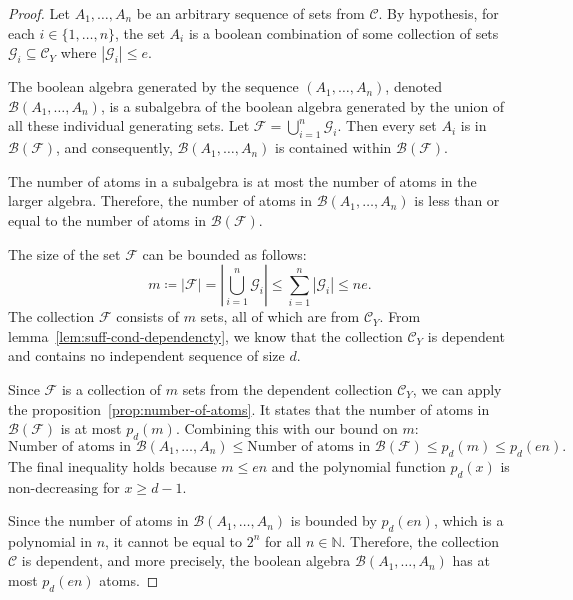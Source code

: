 \begin{proof}

    Let $A_1, \dots, A_n$ be an arbitrary sequence of sets from $\mathcal{C}$. By hypothesis, for each $i \in \{1, \dots, n\}$, the set $A_i$ is a boolean combination of some collection of sets $\mathcal{G}_i \subseteq \mathcal{C}_Y$ where $|\mathcal{G}_i| \le e$.

    The boolean algebra generated by the sequence $(A_1, \dots, A_n)$, denoted $\mathcal{B}(A_1, \dots, A_n)$, is a subalgebra of the boolean algebra generated by the union of all these individual generating sets. Let $\mathcal{F} = \bigcup_{i=1}^n \mathcal{G}_i$. Then every set $A_i$ is in $\mathcal{B}(\mathcal{F})$, and consequently, $\mathcal{B}(A_1, \dots, A_n)$ is contained within $\mathcal{B}(\mathcal{F})$.

    The number of atoms in a subalgebra is at most the number of atoms in the larger algebra. Therefore, the number of atoms in $\mathcal{B}(A_1, \dots, A_n)$ is less than or equal to the number of atoms in $\mathcal{B}(\mathcal{F})$.

    The size of the set $\mathcal{F}$ can be bounded as follows:
    \[
        m \coloneq |\mathcal{F}| = \left|\bigcup_{i=1}^n \mathcal{G}_i\right| \le \sum_{i=1}^n |\mathcal{G}_i| \le ne.
    \]
    The collection $\mathcal{F}$ consists of $m$ sets, all of which are from $\mathcal{C}_Y$. From lemma~\ref{lem:suff-cond-dependencty}, we know that the collection $\mathcal{C}_Y$ is dependent and contains no independent sequence of size $d$.

    Since $\mathcal{F}$ is a collection of $m$ sets from the dependent collection $\mathcal{C}_Y$, we can apply the proposition~\ref{prop:number-of-atoms}. It states that the number of atoms in $\mathcal{B}(\mathcal{F})$ is at most $p_d(m)$. Combining this with our bound on $m$:
    \[
        \text{Number of atoms in } \mathcal{B}(A_1, \dots, A_n) \le \text{Number of atoms in } \mathcal{B}(\mathcal{F}) \le p_d(m) \le p_d(en).
    \]
    The final inequality holds because $m \le en$ and the polynomial function $p_d(x)$ is non-decreasing for $x \ge d-1$.

    Since the number of atoms in $\mathcal{B}(A_1, \dots, A_n)$ is bounded by $p_d(en)$, which is a polynomial in $n$, it cannot be equal to $2^n$ for all $n \in \mathbb{N}$. Therefore, the collection $\mathcal{C}$ is dependent, and more precisely, the boolean algebra $\mathcal{B}(A_1, \dots, A_n)$ has at most $p_d(en)$ atoms.
\end{proof}
